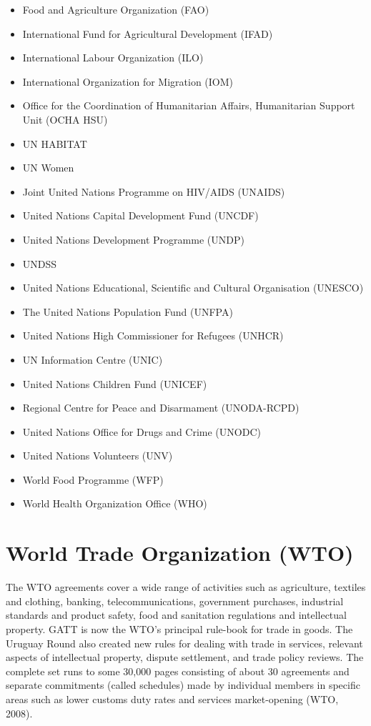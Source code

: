 \documentclass[
  openany]{book}
\providecommand{\tightlist}{%
  \setlength{\itemsep}{0pt}\setlength{\parskip}{0pt}}
\begin{document}
\begin{itemize}
\tightlist
\item
  Food and Agriculture Organization (FAO)
\item
  International Fund for Agricultural Development (IFAD)
\item
  International Labour Organization (ILO)
\item
  International Organization for Migration (IOM)
\item
  Office for the Coordination of Humanitarian Affairs, Humanitarian Support Unit (OCHA HSU)
\item
  UN HABITAT
\item
  UN Women
\item
  Joint United Nations Programme on HIV/AIDS (UNAIDS)
\item
  United Nations Capital Development Fund (UNCDF)
\item
  United Nations Development Programme (UNDP)
\item
  UNDSS
\item
  United Nations Educational, Scientific and Cultural Organisation (UNESCO)
\item
  The United Nations Population Fund (UNFPA)
\item
  United Nations High Commissioner for Refugees (UNHCR)
\item
  UN Information Centre (UNIC)
\item
  United Nations Children Fund (UNICEF)
\item
  Regional Centre for Peace and Disarmament (UNODA-RCPD)
\item
  United Nations Office for Drugs and Crime (UNODC)
\item
  United Nations Volunteers (UNV)
\item
  World Food Programme (WFP)
\item
  World Health Organization Office (WHO)
\end{itemize}

\hypertarget{world-trade-organization-wto}{%
\section{World Trade Organization (WTO)}\label{world-trade-organization-wto}}

The WTO agreements cover a wide range of activities such as agriculture, textiles and clothing, banking, telecommunications, government purchases, industrial standards and product safety, food and sanitation regulations and intellectual property. GATT is now the WTO's principal rule-book for trade in goods. The Uruguay Round also created new rules for dealing with trade in services, relevant aspects of intellectual property, dispute settlement, and trade policy reviews. The complete set runs to some 30,000 pages consisting of about 30 agreements and separate commitments (called schedules) made by individual members in specific areas such as lower customs duty rates and services market-opening (WTO, 2008).
\end{document}

